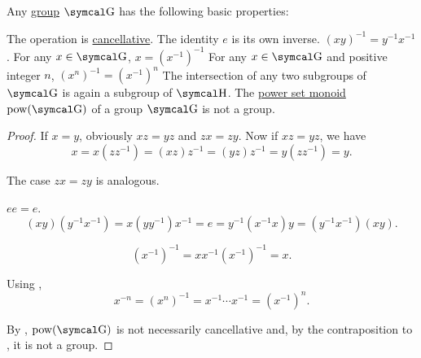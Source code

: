 \begin{proposition}\label{thm:group_properties}
  Any \hyperref[def:group]{group} \( \CG \) has the following basic properties:
  \begin{PropEnum}
     The operation is \hyperref[def:magma/cancellative]{cancellative}.
     The identity \( e \) is its own inverse.
     \( (xy)^{-1} = y^{-1} x^{-1} \).
     For any \( x \in \CG \), \( x = (x^{-1})^{-1} \)
     For any \( x \in \CG \) and positive integer \( n \), \( (x^n)^{-1} = (x^{-1})^n \)
     The intersection of any two subgroups of \( \CG \) is again a subgroup of \( \CH \).
     The \hyperref[def:magma/power_set]{power set monoid} \( \Pow(\CG) \) of a group \( \CG \) is not a group.
  \end{PropEnum}
\end{proposition}
\begin{proof}
   If \( x = y \), obviously \( xz = yz \) and \( zx = zy \). Now if \( xz = yz \), we have
  \begin{equation*}
    x = x(zz^{-1}) = (xz)z^{-1} = (yz)z^{-1} = y(zz^{-1}) = y.
  \end{equation*}

  The case \( zx = zy \) is analogous.

   \( ee = e \).
  \begin{equation*}
    (xy) (y^{-1} x^{-1})
    =
    x (y y^{-1}) x^{-1}
    =
    e
    =
    y^{-1} (x^{-1} x) y
    =
    (y^{-1} x^{-1}) (xy).
  \end{equation*}

  \begin{equation*}
    (x^{-1})^{-1}
    =
    x x^{-1} (x^{-1})^{-1}
    =
    x.
  \end{equation*}

   Using ,
  \begin{equation*}
    x^{-n}
    =
    (x^n)^{-1}
    =
    x^{-1} \cdots x^{-1}
    =
    (x^{-1})^n.
  \end{equation*}

   By , \( \Pow(\CG) \) is not necessarily cancellative and, by the contraposition to , it is not a group.
\end{proof}

